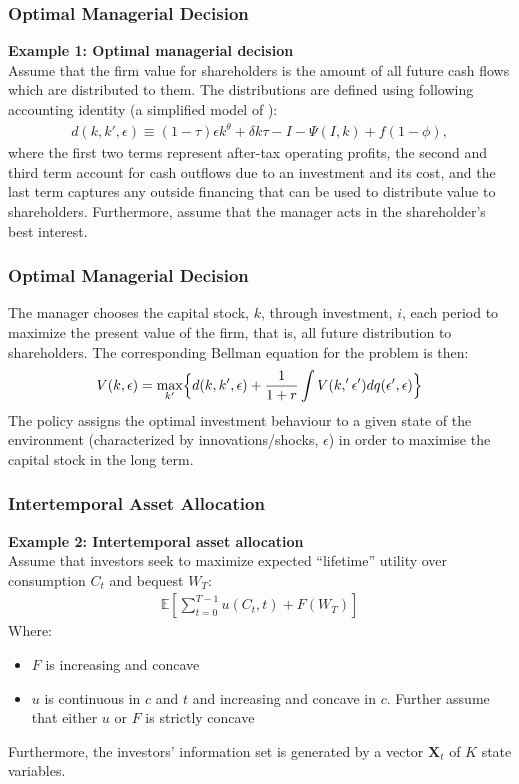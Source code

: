 \documentclass[xcolor=dvipsnames, english, 8pt]{beamer}
\begin{document}
\begin{frame}

    \frametitle{Optimal Managerial Decision}
    \textbf{Example 1: Optimal managerial decision}\vspace{0.5cm}\\
    Assume that the firm value for shareholders is the amount of all future cash flows which are distributed to them. The distributions are defined using following accounting identity (a simplified model of \cite{Nikolov2014}):
    \begin{align}
    d(k,k',\epsilon) \equiv (1-\tau)\epsilon k^{\theta} + \delta k \tau - I - \Psi(I,k) + f(1-\phi),
\end{align}
    where the first two terms represent after-tax operating profits, the second and third term account for cash outflows due to an investment and its cost, and the last term captures any outside financing that can be used to distribute value to shareholders. Furthermore, assume that the manager acts in the shareholder's best interest.
\end{frame}

\begin{frame}
    \frametitle{Optimal Managerial Decision}
    The manager {\color{ubRed}chooses the capital stock}, $k$, through investment, $i$,  each period to maximize the present value of the firm, that is, all future distribution to shareholders. The corresponding Bellman equation for the problem is then:
    \begin{align}
    V(k,\epsilon) ={\max\limits_{k'}} \Bigl\{ d(k,k',\epsilon)  + \frac{1}{1+r} \int  V(k,'\epsilon')   dq(\epsilon',\epsilon)      \Bigr\}
\end{align}
The policy assigns the optimal investment behaviour to a given state of the environment (characterized by innovations/shocks, $\epsilon$) in order to maximise the capital stock in the long term.
\end{frame}

\begin{frame}
    \frametitle{Intertemporal Asset Allocation}
    \textbf{Example 2: Intertemporal asset allocation}\vspace{0.5cm}\\
    Assume that investors seek to maximize expected ``lifetime'' utility over consumption $C_t$ and bequest $W_T$:
    \begin{align}
      \mathbb{E}\left[\sum_{t=0}^{T-1}u(C_t,t)+F(W_T)\right]
  \end{align}
      Where:\vspace{0.25cm}\\
      \begin{itemize}
      \item $F$ is increasing and concave
      \item $u$ is continuous in $c$ and $t$ and increasing and concave in $c$. Further assume that either $u$ or $F$ is strictly concave\vspace{0.25cm}\\
      \end{itemize}
Furthermore, the investors' information set is generated by a vector $\mathbf{X}_t$ of $K$ state variables.
\end{frame}
\end{document}
